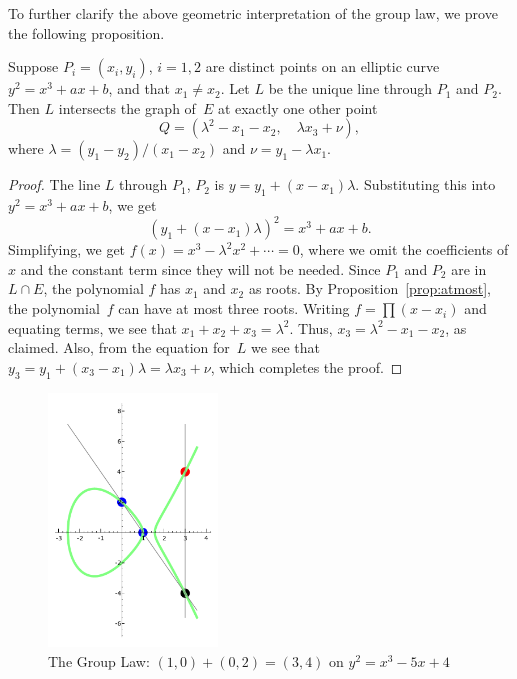 To further clarify the above geometric interpretation of the group
law, we prove the following proposition.
\begin{proposition}\label{prop:geom_grouplaw}%
Suppose $P_i=(x_i,y_i)$, $i=1,2$ are distinct points on an elliptic
curve $y^2=x^3+ax+b$, and that $x_1\neq x_2$.  Let $L$ be
the unique line through $P_1$ and $P_2$.   Then $L$
intersects the graph of~$E$ at exactly one other point
$$
  Q = \left(\lambda^2 -x_1 - x_2,\quad \lambda x_3 + \nu\right),
$$
where $\lambda = (y_1-y_2)/(x_1-x_2)$ and $\nu = y_1 - \lambda x_1$.
\end{proposition}
\begin{proof}
  The line $L$ through $P_1$, $P_2$ is $y = y_1 + (x-x_1)\lambda$.
  Substituting this into $y^2=x^3+ax+b$, we get
  $$
  (y_1+(x-x_1)\lambda)^2 = x^3 + ax + b.
  $$
  Simplifying, we get $f(x) = x^3 - \lambda^2 x^2 + \cdots = 0$, where we
  omit the coefficients of $x$ and the constant term since they will
not be needed.
  Since $P_1$ and $P_2$ are in $L\cap E$, the polynomial $f$
  has $x_1$ and $x_2$ as roots.  By Proposition~\ref{prop:atmost},
the polynomial~$f$
  can have at most three roots.   Writing $f=\prod(x-x_i)$
and equating terms, we see that
 $x_1+x_2 + x_3 = \lambda^2$.  Thus, $x_3 = \lambda^2 - x_1-x_2$,
as claimed.  Also, from the equation for~$L$ we see that
$y_3 = y_1 + (x_3 - x_1)\lambda = \lambda x_3 + \nu$, which
completes the proof.
\end{proof}

\begin{figure}
\begin{center}
\includegraphics[width=0.4\textwidth]{graphics/gplaw}
\caption{The Group Law: $(1,0)+(0,2)=(3,4)$ on $y^2=x^3-5x+4$}
\label{fig:geomgrouplaw}
\end{center}
\end{figure}


